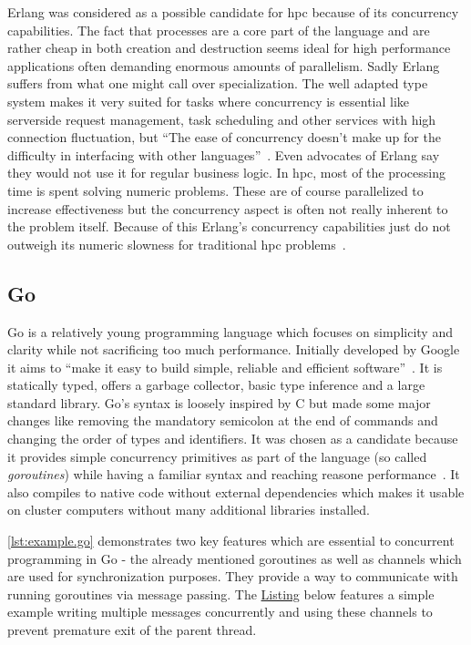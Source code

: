Erlang was considered as a possible candidate for \gls{hpc} because of its concurrency capabilities. The fact that processes are a core part of the language and are rather cheap in both creation and destruction seems ideal for high performance applications often demanding enormous amounts of parallelism. Sadly Erlang suffers from what one might call over specialization. The well adapted type system makes it very suited for tasks where concurrency is essential like serverside request management, task scheduling and other services with high connection fluctuation, but ``The ease of concurrency doesn’t make up for the difficulty in interfacing with other languages''~\cite{erlang_fps}. Even advocates of Erlang say they would not use it for regular business logic. In \gls{hpc},  most of the processing time is spent solving numeric problems. These are of course parallelized to increase effectiveness but the concurrency aspect is often not really inherent to the problem itself. Because of this Erlang's concurrency capabilities just do not outweigh its numeric slowness for traditional \gls{hpc} problems~\cite{erlang_guide}.

\subsection*{Go}
\label{subsec:State_of_the_art::Candidates::Go}

Go is a relatively young programming language which focuses on simplicity and clarity while not sacrificing too much performance. Initially developed by Google it aims to ``make it easy to build simple, reliable and efficient software''~\cite{go_home}. It is statically typed, offers a garbage collector, basic type inference and a large standard library. Go's syntax is loosely inspired by C but made some major changes like removing the mandatory semicolon at the end of commands and changing the order of types and identifiers. It was chosen as a candidate because it provides simple concurrency primitives as part of the language (so called \textit{\glspl{goroutine}}) while having a familiar syntax and reaching reasone performance~\cite{intro_go}. It also compiles to native code without external dependencies which makes it usable on cluster computers without many additional libraries installed.

\autoref{lst:example.go} demonstrates two key features which are essential to concurrent programming in Go - the already mentioned \glspl{goroutine} as well as channels which are used for synchronization purposes. They provide a way to communicate with running \glspl{goroutine} via message passing. The \hyperref[lst:example.go]{Listing} below features a simple example writing multiple messages concurrently and using these channels to prevent premature exit of the parent thread.
\newpage



